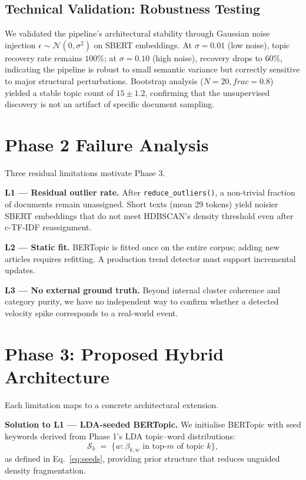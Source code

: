 \documentclass[10pt,twocolumn,a4paper]{article}
\begin{document}
\subsection{Technical Validation: Robustness Testing}
\label{sec:robustness}

We validated the pipeline's architectural stability through Gaussian noise injection $\epsilon \sim \mathcal{N}(0, \sigma^2)$ on SBERT embeddings. At $\sigma=0.01$ (low noise), topic recovery rate remains $100\%$; at $\sigma=0.10$ (high noise), recovery drops to $60\%$, indicating the pipeline is robust to small semantic variance but correctly sensitive to major structural perturbations. Bootstrap analysis ($N=20, frac=0.8$) yielded a stable topic count of $15 \pm 1.2$, confirming that the unsupervised discovery is not an artifact of specific document sampling.

\section{Phase 2 Failure Analysis}
\label{sec:phase2fail}

Three residual limitations motivate Phase 3.

\textbf{L1 --- Residual outlier rate.} After \texttt{reduce\_outliers()}, a non-trivial fraction of documents remain unassigned. Short texts (mean 29 tokens) yield noisier SBERT embeddings that do not meet HDBSCAN's density threshold even after c-TF-IDF reassignment.

\textbf{L2 --- Static fit.} BERTopic is fitted once on the entire corpus; adding new articles requires refitting. A production trend detector must support incremental updates.

\textbf{L3 --- No external ground truth.} Beyond internal cluster coherence and category purity, we have no independent way to confirm whether a detected velocity spike corresponds to a real-world event.

\section{Phase 3: Proposed Hybrid Architecture}
\label{sec:phase3}

Each limitation maps to a concrete architectural extension.

\textbf{Solution to L1 --- LDA-seeded BERTopic.} We initialise BERTopic with seed keywords derived from Phase 1's LDA topic--word distributions:
\begin{equation}
\label{eq:seeds}
\mathcal{S}_k \;=\; \bigl\{ w : \beta_{k,w} \text{ in top-}m \text{ of topic } k \bigr\},
\end{equation}
as defined in Eq.~\eqref{eq:seeds}, providing prior structure that reduces unguided density fragmentation.
\end{document}
